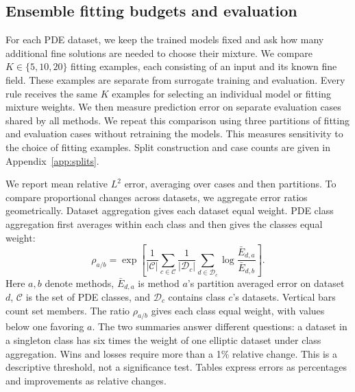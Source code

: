 \subsection{Ensemble fitting budgets and evaluation}
For each PDE dataset, we keep the trained models fixed and ask how many
additional fine solutions are needed to choose their mixture. We compare
$K\in\{5,10,20\}$ fitting examples, each consisting of an input and its known
fine field. These examples are separate from surrogate training and evaluation.
Every rule receives the same $K$ examples for selecting an individual model
or fitting mixture weights. We then measure prediction error on
separate evaluation cases shared by all methods. We repeat this comparison
using three partitions of fitting and evaluation cases without retraining
the models. This measures sensitivity to the choice of fitting examples.
Split construction and case counts are given in Appendix~\ref{app:splits}.

We report mean relative $L^2$ error, averaging over cases and then partitions.
To compare proportional changes across datasets, we aggregate error ratios
geometrically. Dataset aggregation gives each dataset equal weight. PDE class
aggregation first averages within each class and then gives the classes equal
weight:
\begin{equation}
 \rho_{a/b}=\exp\!\left[\frac1{|\mathcal C|}\sum_{c\in\mathcal C}
 \frac1{|\mathcal D_c|}\sum_{d\in\mathcal D_c}\log\frac{\bar E_{d,a}}{\bar E_{d,b}}\right].
 \label{eq:aggregate}
\end{equation}
Here $a,b$ denote methods, $\bar E_{d,a}$ is method $a$'s partition averaged error
on dataset $d$, $\mathcal C$ is the set of PDE classes, and $\mathcal D_c$ contains
class $c$'s datasets. Vertical bars count set members. The ratio $\rho_{a/b}$ gives
each class equal weight, with values below one favoring $a$. The two summaries answer
different questions: a dataset in a singleton class has six times the weight
of one elliptic dataset under class aggregation. Wins and losses require more
than a 1\% relative change. This is a descriptive threshold, not a significance
test. Tables express errors as percentages and improvements as relative changes.
